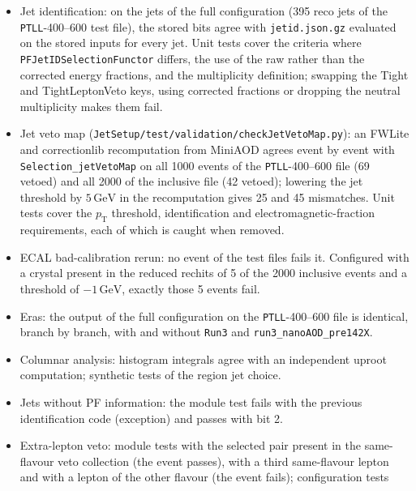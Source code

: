 \documentclass[11pt]{article}
\newcommand{\pt}{p_{\mathrm{T}}}
\newcommand{\GeV}{\ensuremath{\,\mathrm{GeV}}}
\newcommand{\code}[1]{\texttt{#1}}
\begin{document}
\begin{itemize}
  \code{bosonPt}, \code{bosonDR} and \code{nBosonDaughters} are recomputed from the NANO \code{GenPart} table. On
  30\,000 events each of $ZZ\to2\ell2q$ (419 gen jets, 160 associated with a $Z$) and $WZ\to2\ell2q$ (848 gen jets,
  276 associated with a $W$) there is no mismatch; recomputing with a radius of 0.6 instead of 0.8 gives 17 and 39
  mismatches. Of the associated jets, 58 of 160 ($Z$) and 147 of 276 ($W$) contain both quark daughters.
\item Jet identification: on the jets of the full configuration (395 reco jets of the \code{PTLL}-400--600 test
  file), the stored bits agree with \code{jetid.json.gz} evaluated on the stored inputs for every jet. Unit tests cover
  the criteria where \code{PFJetIDSelectionFunctor} differs, the use of the raw rather than the corrected energy
  fractions, and the multiplicity definition; swapping the Tight and TightLeptonVeto keys, using corrected fractions or
  dropping the neutral multiplicity makes them fail.
\item Jet veto map (\code{JetSetup/\allowbreak{}test/\allowbreak{}validation/\allowbreak{}checkJetVetoMap.py}): an
  FWLite and correctionlib recomputation from MiniAOD agrees event by event with \code{Selection\_jetVetoMap} on all
  1000 events of the \code{PTLL}-400--600 file (69 vetoed) and all 2000 of the inclusive file (42 vetoed); lowering the
  jet threshold by $5\GeV$ in the recomputation gives 25 and 45 mismatches. Unit tests cover the $\pt$ threshold,
  identification and electromagnetic-fraction requirements, each of which is caught when removed.
\item ECAL bad-calibration rerun: no event of the test files fails it. Configured with a crystal present in the
  reduced rechits of 5 of the 2000 inclusive events and a threshold of $-1\GeV$, exactly those 5 events fail.
\item Eras: the output of the full configuration on the \code{PTLL}-400--600 file is identical, branch by branch, with
  and without \code{Run3} and \code{run3\_nanoAOD\_pre142X}.
\item Columnar analysis: histogram integrals agree with an independent uproot computation; synthetic tests of the
  region jet choice.
\item Jets without PF information: the module test fails with the previous identification code (exception) and passes
  with bit 2.
\item Extra-lepton veto: module tests with the selected pair present in the same-flavour veto collection (the event
  passes), with a third same-flavour lepton and with a lepton of the other flavour (the event fails); configuration tests

\end{itemize}
\end{document}
